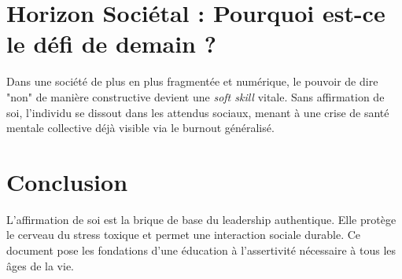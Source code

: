 \documentclass[11.5pt,a4paper]{article}
\begin{document}
\section{Horizon Sociétal : Pourquoi est-ce le défi de demain ?}
Dans une société de plus en plus fragmentée et numérique, le pouvoir de dire "non" de manière constructive devient une \textit{soft skill} vitale. Sans affirmation de soi, l'individu se dissout dans les attendus sociaux, menant à une crise de santé mentale collective déjà visible via le burnout généralisé.

\section{Conclusion}
L'affirmation de soi est la brique de base du leadership authentique. Elle protège le cerveau du stress toxique et permet une interaction sociale durable. Ce document pose les fondations d'une éducation à l'assertivité nécessaire à tous les âges de la vie.
\end{document}
